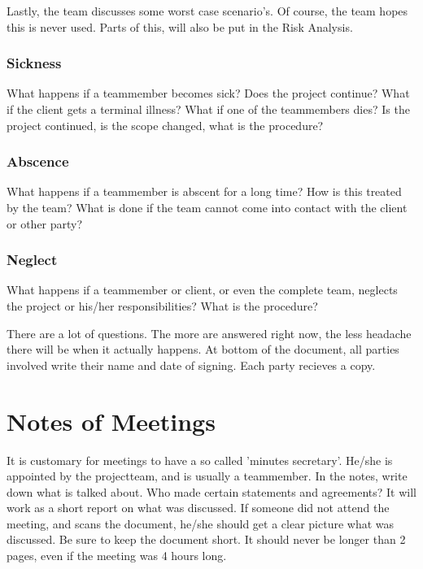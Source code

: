\documentclass[10pt]{report}
\begin{document}
Lastly, the team discusses some worst case scenario's. Of course, the team hopes this is never used. Parts of this, will also be put in the Risk Analysis.

\subsubsection{Sickness}

What happens if a teammember becomes sick? Does the project continue? What if the client gets a terminal illness? What if one of the teammembers dies? Is the project continued, is the scope changed, what is the procedure?

\subsubsection{Abscence}

What happens if a teammember is abscent for a long time? How is this treated by the team? What is done if the team cannot come into contact with the client or other party?

\subsubsection{Neglect}

What happens if a teammember or client, or even the complete team, neglects the project or his/her responsibilities? What is the procedure?

\bigskip

\noindent There are a lot of questions. The more are answered right now, the less headache there will be when it actually happens. At bottom of the document, all parties involved write their name and date of signing. Each party recieves a copy.

\newpage

\section{Notes of Meetings}

It is customary for meetings to have a so called 'minutes secretary'. He/she is appointed by the projectteam, and is usually a teammember. In the notes, write down what is talked about. Who made certain statements and agreements? It will work as a short report on what was discussed. If someone did not attend the meeting, and scans the document, he/she should get a clear picture what was discussed. Be sure to keep the document short. It should never be longer than 2 pages, even if the meeting was 4 hours long.
\end{document}

